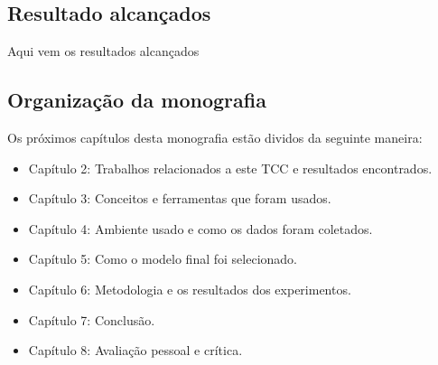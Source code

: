 \subsection{Resultado alcançados}

Aqui vem os resultados alcançados

\subsection{Organização da monografia}

Os próximos capítulos desta monografia estão dividos da seguinte maneira: 

\begin{itemize}
    \item Capítulo 2: Trabalhos relacionados a este TCC e resultados encontrados.
    \item Capítulo 3: Conceitos e ferramentas que foram usados.
    \item Capítulo 4: Ambiente usado e como os dados foram coletados.
    \item Capítulo 5: Como o modelo final foi selecionado.
    \item Capítulo 6: Metodologia e os resultados dos experimentos.
    \item Capítulo 7: Conclusão.
    \item Capítulo 8: Avaliação pessoal e crítica.
\end{itemize}